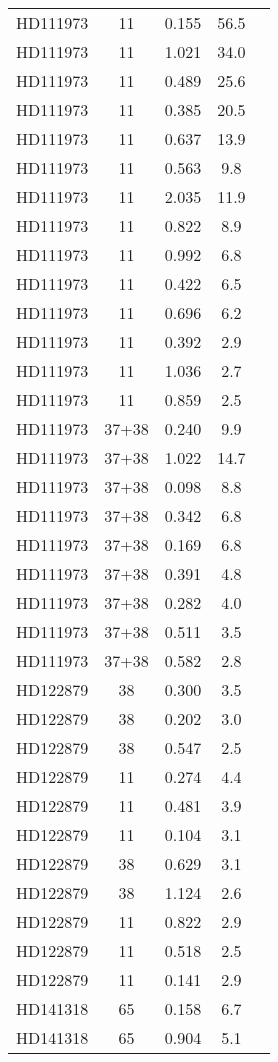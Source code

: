 \begin{table*}
\begin{tabular}{l c c c c}
HD111973 & 11 & 0.155 & 56.5\\ 
HD111973 & 11 & 1.021 & 34.0\\ 
HD111973 & 11 & 0.489 & 25.6\\ 
HD111973 & 11 & 0.385 & 20.5\\ 
HD111973 & 11 & 0.637 & 13.9\\ 
HD111973 & 11 & 0.563 & 9.8\\ 
HD111973 & 11 & 2.035 & 11.9\\ 
HD111973 & 11 & 0.822 & 8.9\\ 
HD111973 & 11 & 0.992 & 6.8\\ 
HD111973 & 11 & 0.422 & 6.5\\ 
HD111973 & 11 & 0.696 & 6.2\\ 
HD111973 & 11 & 0.392 & 2.9\\ 
HD111973 & 11 & 1.036 & 2.7\\ 
HD111973 & 11 & 0.859 & 2.5\\ 
HD111973 & 37+38 & 0.240 & 9.9\\ 
HD111973 & 37+38 & 1.022 & 14.7\\ 
HD111973 & 37+38 & 0.098 & 8.8\\ 
HD111973 & 37+38 & 0.342 & 6.8\\ 
HD111973 & 37+38 & 0.169 & 6.8\\ 
HD111973 & 37+38 & 0.391 & 4.8\\ 
HD111973 & 37+38 & 0.282 & 4.0\\ 
HD111973 & 37+38 & 0.511 & 3.5\\ 
HD111973 & 37+38 & 0.582 & 2.8\\ 
\hline
HD122879 & 38 & 0.300 & 3.5\\ 
HD122879 & 38 & 0.202 & 3.0\\ 
HD122879 & 38 & 0.547 & 2.5\\ 
HD122879 & 11 & 0.274 & 4.4\\ 
HD122879 & 11 & 0.481 & 3.9\\ 
HD122879 & 11 & 0.104 & 3.1\\ 
HD122879 & 38 & 0.629 & 3.1\\ 
HD122879 & 38 & 1.124 & 2.6\\ 
HD122879 & 11 & 0.822 & 2.9\\ 
HD122879 & 11 & 0.518 & 2.5\\ 
HD122879 & 11 & 0.141 & 2.9\\ 
\hline
HD141318 & 65 & 0.158 & 6.7\\ 
HD141318 & 65 & 0.904 & 5.1\\ 

\end{tabular}
\end{table*}
